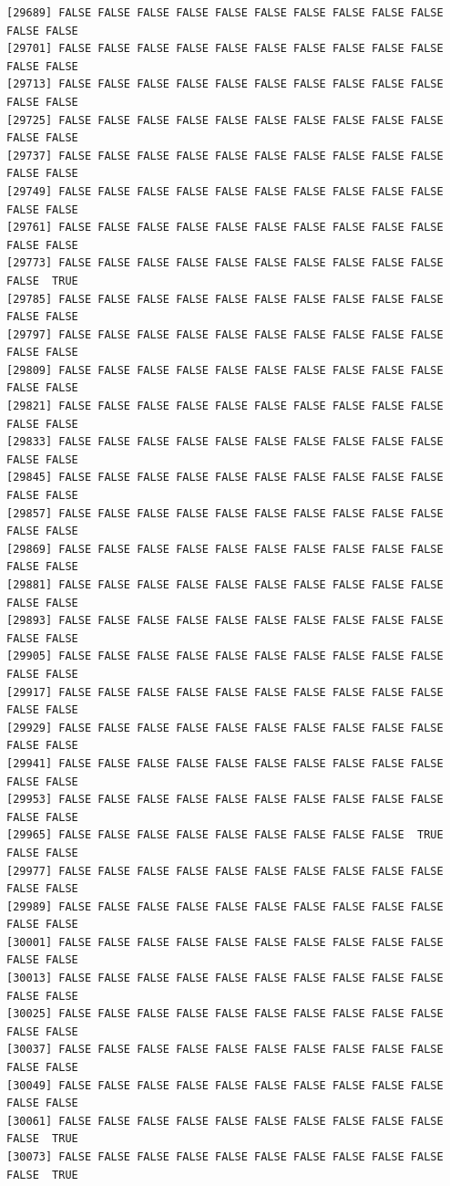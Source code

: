 \documentclass[
  a4paper,
  DIV=11,
  numbers=noendperiod]{scrartcl}
\begin{document}
\begin{verbatim}
[29689] FALSE FALSE FALSE FALSE FALSE FALSE FALSE FALSE FALSE FALSE FALSE FALSE
[29701] FALSE FALSE FALSE FALSE FALSE FALSE FALSE FALSE FALSE FALSE FALSE FALSE
[29713] FALSE FALSE FALSE FALSE FALSE FALSE FALSE FALSE FALSE FALSE FALSE FALSE
[29725] FALSE FALSE FALSE FALSE FALSE FALSE FALSE FALSE FALSE FALSE FALSE FALSE
[29737] FALSE FALSE FALSE FALSE FALSE FALSE FALSE FALSE FALSE FALSE FALSE FALSE
[29749] FALSE FALSE FALSE FALSE FALSE FALSE FALSE FALSE FALSE FALSE FALSE FALSE
[29761] FALSE FALSE FALSE FALSE FALSE FALSE FALSE FALSE FALSE FALSE FALSE FALSE
[29773] FALSE FALSE FALSE FALSE FALSE FALSE FALSE FALSE FALSE FALSE FALSE  TRUE
[29785] FALSE FALSE FALSE FALSE FALSE FALSE FALSE FALSE FALSE FALSE FALSE FALSE
[29797] FALSE FALSE FALSE FALSE FALSE FALSE FALSE FALSE FALSE FALSE FALSE FALSE
[29809] FALSE FALSE FALSE FALSE FALSE FALSE FALSE FALSE FALSE FALSE FALSE FALSE
[29821] FALSE FALSE FALSE FALSE FALSE FALSE FALSE FALSE FALSE FALSE FALSE FALSE
[29833] FALSE FALSE FALSE FALSE FALSE FALSE FALSE FALSE FALSE FALSE FALSE FALSE
[29845] FALSE FALSE FALSE FALSE FALSE FALSE FALSE FALSE FALSE FALSE FALSE FALSE
[29857] FALSE FALSE FALSE FALSE FALSE FALSE FALSE FALSE FALSE FALSE FALSE FALSE
[29869] FALSE FALSE FALSE FALSE FALSE FALSE FALSE FALSE FALSE FALSE FALSE FALSE
[29881] FALSE FALSE FALSE FALSE FALSE FALSE FALSE FALSE FALSE FALSE FALSE FALSE
[29893] FALSE FALSE FALSE FALSE FALSE FALSE FALSE FALSE FALSE FALSE FALSE FALSE
[29905] FALSE FALSE FALSE FALSE FALSE FALSE FALSE FALSE FALSE FALSE FALSE FALSE
[29917] FALSE FALSE FALSE FALSE FALSE FALSE FALSE FALSE FALSE FALSE FALSE FALSE
[29929] FALSE FALSE FALSE FALSE FALSE FALSE FALSE FALSE FALSE FALSE FALSE FALSE
[29941] FALSE FALSE FALSE FALSE FALSE FALSE FALSE FALSE FALSE FALSE FALSE FALSE
[29953] FALSE FALSE FALSE FALSE FALSE FALSE FALSE FALSE FALSE FALSE FALSE FALSE
[29965] FALSE FALSE FALSE FALSE FALSE FALSE FALSE FALSE FALSE  TRUE FALSE FALSE
[29977] FALSE FALSE FALSE FALSE FALSE FALSE FALSE FALSE FALSE FALSE FALSE FALSE
[29989] FALSE FALSE FALSE FALSE FALSE FALSE FALSE FALSE FALSE FALSE FALSE FALSE
[30001] FALSE FALSE FALSE FALSE FALSE FALSE FALSE FALSE FALSE FALSE FALSE FALSE
[30013] FALSE FALSE FALSE FALSE FALSE FALSE FALSE FALSE FALSE FALSE FALSE FALSE
[30025] FALSE FALSE FALSE FALSE FALSE FALSE FALSE FALSE FALSE FALSE FALSE FALSE
[30037] FALSE FALSE FALSE FALSE FALSE FALSE FALSE FALSE FALSE FALSE FALSE FALSE
[30049] FALSE FALSE FALSE FALSE FALSE FALSE FALSE FALSE FALSE FALSE FALSE FALSE
[30061] FALSE FALSE FALSE FALSE FALSE FALSE FALSE FALSE FALSE FALSE FALSE  TRUE
[30073] FALSE FALSE FALSE FALSE FALSE FALSE FALSE FALSE FALSE FALSE FALSE  TRUE

\end{verbatim}
\end{document}
